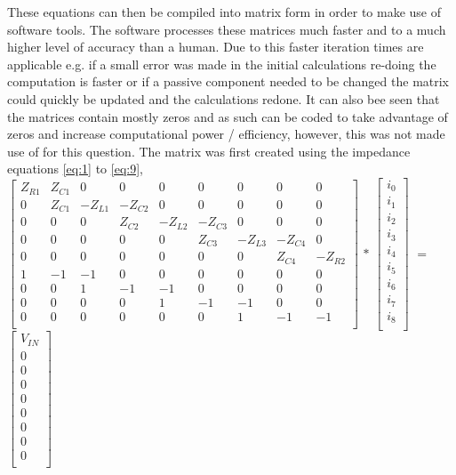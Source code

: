 \documentclass[11pt,a4paper]{article}
\begin{document}
These equations can then be compiled into matrix form in order to make use of software tools. The software processes these matrices much faster and to a much higher level of accuracy than a human. Due to this faster iteration times are applicable e.g. if a small error was made in the initial calculations re-doing the computation is faster or if a passive component needed to be changed the matrix could quickly be updated and the calculations redone. It can also bee seen that the matrices contain mostly zeros and as such can be coded to take advantage of zeros and increase computational power / efficiency, however, this was not made use of for this question. The matrix was first created using the impedance equations \ref{eq:1} to \ref{eq:9},\\

$\begin{bmatrix*}
	Z_{R1} & Z_{C1} & 0 & 0 & 0 & 0 & 0 & 0 & 0 \\
	0 & Z_{C1} & -Z_{L1} & -Z_{C2} & 0 & 0 & 0 & 0 & 0\\
	0 & 0 &  0 & Z_{C2} & -Z_{L2} & -Z_{C3} & 0 & 0 & 0\\
	0 & 0 & 0 & 0 & 0 & Z_{C3} & -Z_{L3} & -Z_{C4} & 0\\
	0 & 0 & 0 & 0 & 0 & 0 & 0 & Z_{C4} & -Z_{R2}\\
	1 & -1 & -1 & 0 & 0 & 0 & 0 & 0 & 0\\
	0 & 0 & 1 & -1 & -1 & 0 & 0 & 0 & 0\\
	0 & 0 & 0 & 0 & 1 & -1 & -1 & 0 & 0\\
	0 & 0 & 0 & 0 & 0 & 0 & 1 & -1 & -1\\
\end{bmatrix*}$
$ * $
$\begin{bmatrix}
	i_{0}\\
	i_{1}\\
	i_{2}\\
	i_{3}\\
	i_{4}\\
	i_{5}\\
	i_{6}\\
	i_{7}\\
	i_{8}\\
\end{bmatrix}$
$ = $
$\begin{bmatrix}
	V_{IN}\\
	0\\
	0\\
	0\\
	0\\
	0\\
	0\\
	0\\
	0\\
\end{bmatrix}$ \bigskip
\end{document}
